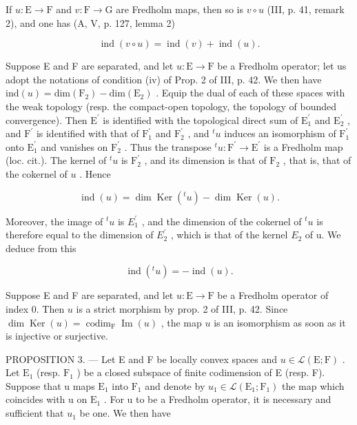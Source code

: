 If \(u \colon \mathrm{E} \to \mathrm{F}\) and \(v \colon \mathrm{F} \to \mathrm{G}\) are Fredholm maps, then so is \(v \circ u\) (III, p. 41, remark 2), and one has (A, V, p. 127, lemma 2)

\[
\operatorname{ind} (v \circ u) = \operatorname{ind} (v) + \operatorname{ind} (u).\tag{2}
\]

Suppose E and F are separated, and let \(u\colon\mathrm{E}\to\mathrm{F}\) be a Fredholm operator; let us adopt the notations of condition (iv) of Prop. 2 of III, p. 42. We then have \(\mathrm{ind}(u)=\mathrm{dim}(\mathrm{F}_{2})-\mathrm{dim}(\mathrm{E}_{2})\) . Equip the dual of each of these spaces with the weak topology (resp. the compact-open topology, the topology of bounded convergence). Then \(\mathrm{E}^{\prime}\) is identified with the topological direct sum of \(\mathrm{E}_{1}^{\prime}\) and \(\mathrm{E}_{2}^{\prime}\) , and \(\mathrm{F}^{\prime}\) is identified with that of \(\mathrm{F}_{1}^{\prime}\) and \(\mathrm{F}_{2}^{\prime}\) , and \(^{t}u\) induces an isomorphism of \(\mathrm{F}_{1}^{\prime}\) onto \(\mathrm{E}_{1}^{\prime}\) and vanishes on \(\mathrm{F}_{2}^{\prime}\) . Thus the transpose \(^{t}u\colon\mathrm{F}^{\prime}\to\mathrm{E}^{\prime}\) is a Fredholm map (loc. cit.). The kernel of \(^{t}u\) is \(\mathrm{F}_{2}^{\prime}\) , and its dimension is that of \(\mathrm{F}_{2}\) , that is, that of the cokernel of \(u\) . Hence

\[
\operatorname{ind} (u) = \dim \operatorname{Ker} (^ {t} u) - \dim \operatorname{Ker} (u).\tag{3}
\]

Moreover, the image of \(^{t}u\) is \(E_{1}^{\prime}\) , and the dimension of the cokernel of \(^{t}u\) is therefore equal to the dimension of \(E_{2}^{\prime}\) , which is that of the kernel \(E_{2}\) of u. We deduce from this

\[
\operatorname{ind} (^ {t} u) = - \operatorname{ind} (u).\tag{4}
\]

Suppose E and F are separated, and let \(u\colon\mathrm{E}\to\mathrm{F}\) be a Fredholm operator of index 0. Then \(u\) is a strict morphism by prop. 2 of III, p. 42. Since \(\dim\operatorname{Ker}(u)=\operatorname{codim}_{\mathrm{F}}\operatorname{Im}(u)\) , the map \(u\) is an isomorphism as soon as it is injective or surjective.

PROPOSITION 3. --- Let E and F be locally convex spaces and \(u \in \mathcal{L}(\mathrm{E};\mathrm{F})\) . Let \(\mathrm{E}_{1}\) (resp. \(\mathrm{F}_{1}\) ) be a closed subspace of finite codimension of E (resp. F). Suppose that u maps \(\mathrm{E}_{1}\) into \(\mathrm{F}_{1}\) and denote by \(u_{1} \in \mathcal{L}(\mathrm{E}_{1};\mathrm{F}_{1})\) the map which coincides with u on \(\mathrm{E}_{1}\) . For u to be a Fredholm operator, it is necessary and sufficient that \(u_{1}\) be one. We then have

